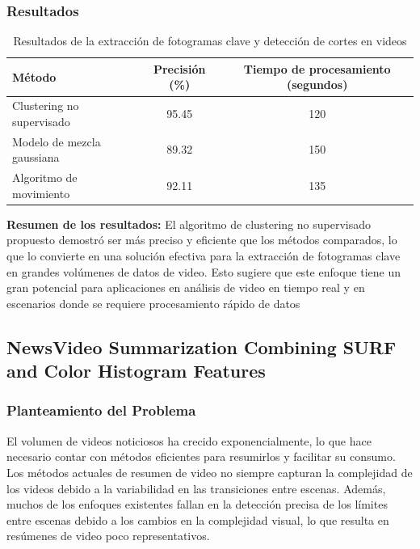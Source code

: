 \subsubsection{Resultados}

\begin{table}[h]
    \centering
    \caption{Resultados de la extracción de fotogramas clave y detección de cortes en videos}
    \begin{tabular}{lcc}
        \hline
        \textbf{Método} & \textbf{Precisión (\%)} & \textbf{Tiempo de procesamiento (segundos)} \\
        \hline
        Clustering no supervisado & 95.45 & 120 \\
        Modelo de mezcla gaussiana & 89.32 & 150 \\
        Algoritmo de movimiento & 92.11 & 135 \\
        \hline
    \end{tabular}
\end{table}


\noindent \textbf{Resumen de los resultados:} 
El algoritmo de clustering no supervisado propuesto demostró ser más preciso y eficiente que los métodos comparados, lo que lo convierte en una solución efectiva para la extracción de fotogramas clave en grandes volúmenes de datos de video. Esto sugiere que este enfoque tiene un gran potencial para aplicaciones en análisis de video en tiempo real y en escenarios donde se requiere procesamiento rápido de datos

\subsection{NewsVideo Summarization Combining SURF and Color Histogram Features}
\cite{liang2021news}
\subsubsection{Planteamiento del Problema}
El volumen de videos noticiosos ha crecido exponencialmente, lo que hace necesario contar con métodos eficientes para resumirlos y facilitar su consumo. Los métodos actuales de resumen de video no siempre capturan la complejidad de los videos debido a la variabilidad en las transiciones entre escenas. Además, muchos de los enfoques existentes fallan en la detección precisa de los límites entre escenas debido a los cambios en la complejidad visual, lo que resulta en resúmenes de video poco representativos.
